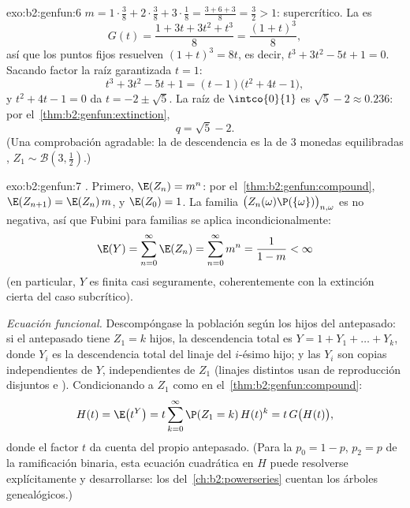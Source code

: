 \begin{solution}{exo:b2:genfun:6}
$m = 1\cdot\frac38 + 2\cdot\frac38 + 3\cdot\frac18 = \frac{3 + 6 +
3}{8} = \frac32 > 1$: supercrítico. La  es
\[
G(t) = \frac{1 + 3t + 3t^2 + t^3}{8} = \frac{(1 + t)^3}{8} ,
\]
así que los puntos fijos resuelven $(1 + t)^3 = 8t$, es decir, $t^3 +
3t^2 - 5t + 1 = 0$. Sacando factor la raíz garantizada $t = 1$:
\[
t^3 + 3t^2 - 5t + 1 = (t - 1)\bigl(t^2 + 4t - 1\bigr),
\]
y $t^2 + 4t - 1 = 0$ da $t = -2 \pm \sqrt5$. La raíz de
$\intco{0}{1}$ es $\sqrt5 - 2 \approx 0.236$: por el~\cref{thm:b2:genfun:extinction},
\[
q = \sqrt 5 - 2 .
\]
(Una comprobación agradable: la  de descendencia es la de $3$
monedas equilibradas , $Z_1 \sim \mathcal{B}(3,
\frac12)$.)
\end{solution}

\begin{solution}{exo:b2:genfun:7}
\emph{.} Primero, $\E(Z_n) = m^n$: por el~\cref{thm:b2:genfun:compound}, $\E(Z_{n+1}) = \E(Z_n)\,m$, y
$\E(Z_0) = 1$. La familia $\bigl(Z_n(\omega)\P(\{\omega\})
\bigr)_{n, \omega}$ es no negativa, así que Fubini para familias se
aplica incondicionalmente:
\[
\E(Y) = \sum_{n=0}^{\infty}\E(Z_n)
= \sum_{n=0}^\infty m^n = \frac{1}{1 - m} < \infty
\]
(en particular, $Y$ es finita casi seguramente, coherentemente con la
extinción cierta del caso subcrítico).

\emph{Ecuación funcional.} Descompóngase la población según los hijos
del antepasado: si el antepasado tiene $Z_1 = k$ hijos, la
descendencia total es $Y = 1 + Y_1 + \dots + Y_k$, donde $Y_i$ es la
descendencia total del linaje del $i$-ésimo hijo; y las $Y_i$ son
copias independientes de $Y$, independientes de $Z_1$ (linajes
distintos usan  de reproducción disjuntos e ).
Condicionando a $Z_1$ como en el~\cref{thm:b2:genfun:compound}:
\[
H(t) = \E\bigl(t^Y\bigr)
= t\sum_{k=0}^\infty \P(Z_1 = k)\,H(t)^k
= t\,G\bigl(H(t)\bigr),
\]
donde el factor $t$ da cuenta del propio antepasado. (Para la 
$p_0 = 1 - p$, $p_2 = p$ de la ramificación binaria, esta ecuación
cuadrática en $H$ puede resolverse explícitamente y desarrollarse:
los  del~\cref{ch:b2:powerseries} cuentan los
árboles genealógicos.)
\end{solution}

